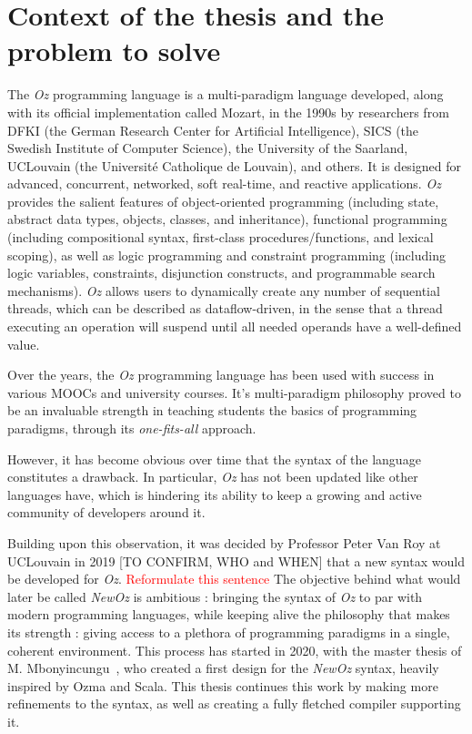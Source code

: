 
\section{Context of the thesis and the problem to solve}\label{sec:ch1-context}
The \textit{Oz} programming language is a multi-paradigm language developed, along with its official implementation called Mozart, in the 1990s by researchers from DFKI (the German Research Center for Artificial Intelligence), SICS (the Swedish Institute of Computer Science), the University of the Saarland, UCLouvain (the Université Catholique de Louvain), and others.
It is designed for advanced, concurrent, networked, soft real-time, and reactive applications.
\textit{Oz} provides the salient features of object-oriented programming (including state, abstract data types, objects, classes, and inheritance),
functional programming (including compositional syntax, first-class procedures/functions, and lexical scoping), as well as
logic programming and constraint programming (including logic variables, constraints, disjunction constructs, and programmable search mechanisms).
\textit{Oz} allows users to dynamically create any number of sequential threads, which can be described as dataflow-driven, in the sense that a thread executing an operation will suspend until all needed operands have a well-defined value.~\cite{mozart2tutorial}

Over the years, the \textit{Oz} programming language has been used with success in various MOOCs and university courses.
It's multi-paradigm philosophy proved to be an invaluable strength in teaching students the basics of programming paradigms, through its \textit{one-fits-all} approach.

However, it has become obvious over time that the syntax of the language constitutes a drawback.
In particular, \textit{Oz} has not been updated like other languages have, which is hindering its ability to keep a growing and active community of developers around it.

Building upon this observation, it was decided by Professor Peter Van Roy at UCLouvain in 2019 [TO CONFIRM, WHO and WHEN] that a new syntax would be developed for \textit{Oz}. \textcolor{red}{Reformulate this sentence}
The objective behind what would later be called \textit{NewOz} is ambitious : bringing the syntax of \textit{Oz} to par with modern programming languages, while keeping alive the philosophy that makes its strength : giving access to a plethora of programming paradigms in a single, coherent environment.
This process has started in 2020, with the master thesis of M. Mbonyincungu~\cite{jpthesis}, who created a first design for the \textit{NewOz} syntax, heavily inspired by Ozma and Scala.
This thesis continues this work by making more refinements to the syntax, as well as creating a fully fletched compiler supporting it.

